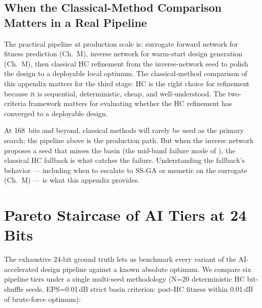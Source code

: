 \subsection{When the Classical-Method Comparison Matters in a Real Pipeline}

The practical pipeline at production scale is: surrogate forward
network for fitness prediction (Ch.~M), inverse network for
warm-start design generation (Ch.~M), then classical HC refinement
from the inverse-network seed to polish the design to a deployable
local optimum. The classical-method comparison of this appendix
matters for the third stage: HC is the right choice for refinement
because it is sequential, deterministic, cheap, and well-understood.
The two-criteria framework matters for evaluating whether the HC
refinement has converged to a deployable design.

At 168~bits and beyond, classical methods will rarely be used as
the primary search; the pipeline above is the production path. But
when the inverse network proposes a seed that misses the basin (the
mid-band failure mode of \cite{Maloney2026Paper1}), the classical
HC fallback is what catches the failure. Understanding the
fallback's behavior --- including when to escalate to SS-GA or
memetic on the surrogate (Ch.~M) --- is what this appendix
provides.


\section{Pareto Staircase of AI Tiers at 24 Bits}\label{sec:p2_tiers}

The exhaustive 24-bit ground truth lets us benchmark every variant of
the AI-accelerated design pipeline against a known absolute optimum.
We compare six pipeline tiers under a single multi-seed methodology
(N=20 deterministic HC bit-shuffle seeds, EPS=0.01\,dB strict basin
criterion: post-HC fitness within 0.01\,dB of brute-force optimum):


